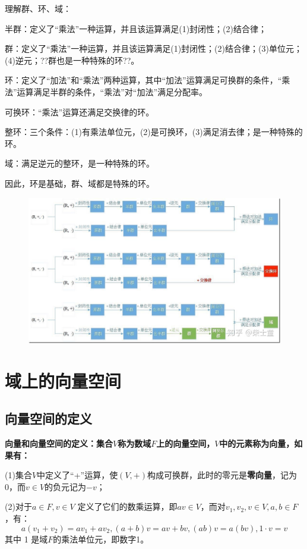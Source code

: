 \documentclass[12pt]{article}
\begin{document}
\begin{framed}
理解群、环、域：

半群：定义了“乘法”一种运算，并且该运算满足(1)封闭性；(2)结合律；

群：定义了“乘法”一种运算，并且该运算满足(1)封闭性；(2)结合律；(3)单位元；(4)逆元；??群也是一种特殊的环??。

环：定义了“加法”和“乘法”两种运算，其中“加法”运算满足可换群的条件，“乘法”运算满足半群的条件，“乘法”对“加法”满足分配率。

可换环：“乘法”运算还满足交换律的环。

整环：三个条件：(1)有乘法单位元，(2)是可换环，(3)满足消去律；是一种特殊的环。

域：满足逆元的整环，是一种特殊的环。

因此，环是基础，群、域都是特殊的环。

\begin{figure}[H]
    \centering
    \includegraphics[width=1.0\textwidth]{fig/GroupRingField.jpg}
\end{figure}
\end{framed}

\section{域上的向量空间}
\subsection{向量空间的定义}
\begin{mdframed}[
linecolor=black!40,outerlinewidth=1pt,roundcorner=.5em,innertopmargin=1ex,innerbottommargin=.5\baselineskip,innerrightmargin=1em,innerleftmargin=1em,backgroundcolor=gray!5,
]
\textbf{
向量和向量空间的定义：集合$V$称为数域$F$上的向量空间，$V$中的元素称为向量，如果有：
}

(1)集合$V$中定义了“+”运算，使$(V,+)$构成可换群，此时的零元是\textbf{零向量}，记为0，而$v \in V$的负元记为$-v$；

(2)对于$a \in F, v \in V$ 定义了它们的数乘运算，即$av \in V$，而对$v_1, v_2,  v \in V, a, b \in F$，有：
$$
a(v_1 + v_2) = av_1 + av_2, (a+b)v = av + bv, (ab)v = a(bv), 1 \cdot v = v
$$
其中 1 是域$F$的乘法单位元，即数字1。
\end{mdframed}
\end{document}
